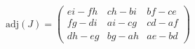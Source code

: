 \documentclass[preview]{standalone}
\begin{document}
$\displaystyle
  \mathrm{adj}(J) = 
  \begin{pmatrix}
    ei-fh & ch-bi & bf-ce \\
    fg-di & ai-cg & cd-af \\
    dh-eg & bg-ah & ae-bd
  \end{pmatrix}
$
\end{document}

